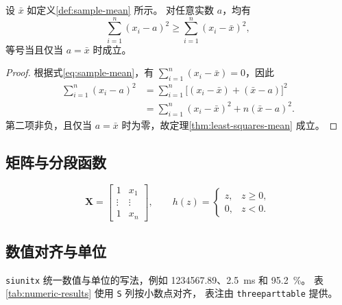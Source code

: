 \begin{theorem}[平方偏差最小化]
  \label{thm:least-squares-mean}
  设 $\bar{x}$ 如定义\ref{def:sample-mean} 所示。
  对任意实数 $a$，均有
  \begin{equation}
    \sum_{i=1}^{n}(x_i-a)^2
      \ge \sum_{i=1}^{n}(x_i-\bar{x})^2,
    \label{eq:least-squares-mean}
  \end{equation}
  等号当且仅当 $a=\bar{x}$ 时成立。
\end{theorem}

\begin{proof}
  根据式\eqref{eq:sample-mean}，有 $\sum_{i=1}^{n}(x_i-\bar{x})=0$，因此
  \begin{align*}
    \sum_{i=1}^{n}(x_i-a)^2
      &= \sum_{i=1}^{n}\bigl[(x_i-\bar{x})+(\bar{x}-a)\bigr]^2 \\
      &= \sum_{i=1}^{n}(x_i-\bar{x})^2+n(\bar{x}-a)^2.
  \end{align*}
  第二项非负，且仅当 $a=\bar{x}$ 时为零，故定理\ref{thm:least-squares-mean} 成立。
\end{proof}

\subsection{矩阵与分段函数}

\begin{equation}
  \boldsymbol{X}=\begin{bmatrix}
    1 & x_1 \\
    \vdots & \vdots \\
    1 & x_n
  \end{bmatrix},
  \qquad
  h(z)=\begin{cases}
    z, & z\ge0, \\
    0, & z<0.
  \end{cases}
  \label{eq:matrix-and-cases}
\end{equation}

\subsection{数值对齐与单位}

\texttt{siunitx} 统一数值与单位的写法，例如
\num{1234567.89}、\qty{2.5}{\milli\second} 和 \qty{95.2}{\percent}。
表\ref{tab:numeric-results} 使用 \texttt{S} 列按小数点对齐，
表注由 \texttt{threeparttable} 提供。


